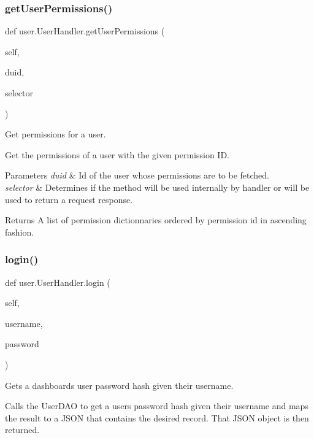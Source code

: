 \subsubsection{\texorpdfstring{get\+User\+Permissions()}{getUserPermissions()}}
{\footnotesize\ttfamily def user.\+User\+Handler.\+get\+User\+Permissions (\begin{DoxyParamCaption}\item[{}]{self,  }\item[{}]{duid,  }\item[{}]{selector }\end{DoxyParamCaption})}



Get permissions for a user. 

Get the permissions of a user with the given permission ID.


\begin{DoxyParams}{Parameters}
{\em duid} & Id of the user whose permissions are to be fetched. \\
\hline
{\em selector} & Determines if the method will be used internally by handler or will be used to return a request response. \\
\hline
\end{DoxyParams}
\begin{DoxyReturn}{Returns}
A list of permission dictionnaries ordered by permission id in ascending fashion. 
\end{DoxyReturn}
\mbox{\label{classuser_1_1_user_handler_a36090fca15a4bd0e1f46970113fe4c5a}} 
\subsubsection{\texorpdfstring{login()}{login()}}
{\footnotesize\ttfamily def user.\+User\+Handler.\+login (\begin{DoxyParamCaption}\item[{}]{self,  }\item[{}]{username,  }\item[{}]{password }\end{DoxyParamCaption})}



Gets a dashboard\textquotesingle{}s user password hash given their username. 

Calls the User\+D\+AO to get a user\textquotesingle{}s password hash given their username and maps the result to a J\+S\+ON that contains the desired record. That J\+S\+ON object is then returned.


